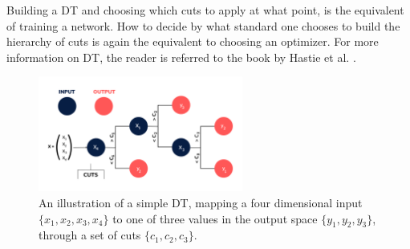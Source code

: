 Building a \ac{DT} and choosing which cuts to apply at what point, is the equivalent of training a 
network. How to decide by what standard one chooses to build the hierarchy of cuts is again the 
equivalent to choosing an optimizer. For more information on \ac{DT}, the reader is referred to the 
book by Hastie et al. \cite{huang_introduction_2014}.
\begin{figure}
    \centering
    \includegraphics[width=0.6\textwidth]{Figures/Illustrations/DT.png}
    \caption{An illustration of a simple \acs{DT}, mapping a four dimensional input $\{x_1,x_2,x_3,x_4\}$ 
    to one of three values in the output space $\{y_1,y_2,y_3\}$, through a set of cuts $\{c_1, c_2,c_{3}\}$.}
    \label{fig:DT}
\end{figure}
